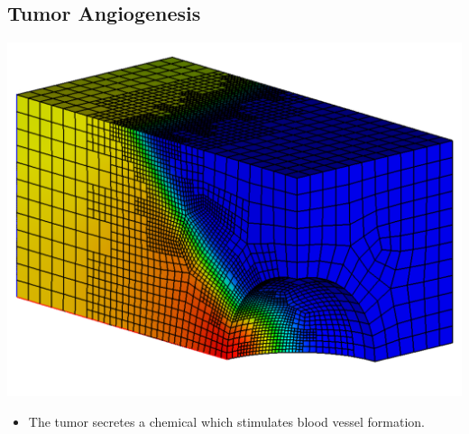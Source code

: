 \subsection*{Tumor Angiogenesis}
\begin{frame}[t]
  \begin{center}
    \includegraphics[width=.6\textwidth]{figures/tumor_model}    
  \end{center}

  \begin{block}{}
    \begin{itemize}
    \item{%
      The tumor secretes
      a chemical which stimulates blood vessel formation.
      }
      \end{itemize}
  \end{block}
\end{frame}


